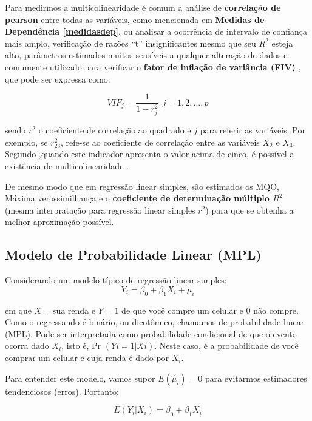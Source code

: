 \documentclass[
  openany]{book}
\begin{document}
Para medirmos a multicolinearidade é comum a análise de \textbf{correlação de pearson} entre todas as variáveis, como mencionada em \textbf{Medidas de Dependência \ref{medidasdep}}, ou analisar a ocorrência de intervalo de confiança mais amplo, verificação de razões ``t'' insignificantes mesmo que seu \(R^2\) esteja alto, parâmetros estimados muitos sensíveis a qualquer alteração de dados e comumente utilizado para verificar o \textbf{fator de inflação de variância (FIV)} \citep{montgomery2012introduction}, que pode ser expressa como:

\begin{equation}
    VIF_j=\frac{1}{1-r^2_j} \ \ j=1,2,...,p
    \label{eq:vif}
\end{equation}

sendo \(r^2\) o coeficiente de correlação ao quadrado e \(j\) para referir as variáveis. Por exemplo, se \(r^2_{23}\), refe-se ao coeficiente de correlação entre as variáveis \(X_2\) e \(X_3\). Segundo ,quando este indicador apresenta o valor acima de cinco, é possível a existência de multicolinearidade \citep{maroco2014analise}.

De mesmo modo que em regressão linear simples, são estimados os MQO, Máxima verossimilhança e o \textbf{coeficiente de determinação múltiplo \(R^2\)} (mesma interpratação para regressão linear simples \(r^2\)) para que se obtenha a melhor aproximação possível.

\hypertarget{mpl}{%
\subsection{Modelo de Probabilidade Linear (MPL)}\label{mpl}}

Considerando um modelo típico de regressão linear simples:
\[Y_i=\beta_0+\beta_1 X_i+\mu_i \]

em que \(X =\)sua renda e \(Y=1\) de que você compre um celular e \(0\) não compre. Como o regressando é binário, ou dicotômico, chamamos de probabilidade linear (MPL). Pode ser interpretada como probabilidade condicional de que o evento ocorra dado \(X_i\), isto é, Pr \((Yi = 1 | Xi)\). Neste caso, é a probabilidade de você comprar um celular e cuja renda é dado por \(X_i\).

Para entender este modelo, vamos supor \(E(\hat{\mu}_i)=0\) para evitarmos estimadores tendenciosos (erros). Portanto:

\begin{equation}
    E(Y_i|X_i)=\beta_0+\beta_1 X_i
    \label{eq:regcond}
\end{equation}
\end{document}
